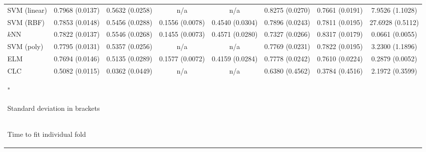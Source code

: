 \documentclass{sig-alternate-05-2015}
\begin{document}
\begin{table}
{\begin{tabular}{l|c|c|c|c|c|c|c}
				SVM (linear)&0.7968 (0.0137)			&0.5632	(0.0258)			&n/a			&n/a			&0.8275	(0.0270)			&0.7661	(0.0191)			&7.9526	(1.1028)\\ 
				SVM (RBF)	&0.7853 (0.0148)			&0.5456	(0.0288)			&0.1556	(0.0078)			&0.4540	(0.0304)			&0.7896	(0.0243)			&0.7811	(0.0195)			&27.6928 (0.5112)\\ 
				$k$NN		&0.7822 (0.0137)			&0.5546	(0.0268)			&0.1455	(0.0073)			&0.4571	(0.0280)			&0.7327	(0.0266)			&0.8317	(0.0179)			&0.0661	(0.0055)\\ 
				SVM (poly)	&0.7795 (0.0131)			&0.5357	(0.0256)			&n/a			&n/a			&0.7769	(0.0231)			&0.7822	(0.0195)			&3.2300	(1.1896)\\ 
				ELM			&0.7694 (0.0146)			&0.5135	(0.0289)			&0.1577	(0.0072)			&0.4159	(0.0284)			&0.7778	(0.0242)&0.7610 (0.0224)			&0.2879	(0.0052)\\ 
				CLC			&0.5082 (0.0115)			&0.0362	(0.0449)			&n/a			&n/a			&0.6380	(0.4562)			&0.3784	(0.4516)			&2.1972	(0.3599)\\                  
				\multicolumn{5}{l}{\textsuperscript{*}\footnotesize{\parbox[t]{7.9cm}{Standard deviation in brackets}}}\\
				\multicolumn{5}{l}{\textsuperscript{\textdagger}\footnotesize{\parbox[t]{7.9cm}{Time to fit individual fold}}}
				
		\end{tabular}}
	\end{table}
	
\end{document}
